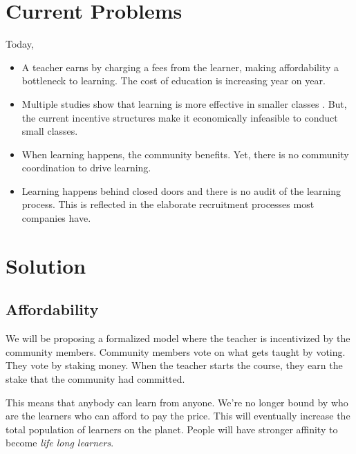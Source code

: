 \documentclass{article}
\begin{document}
  \section{Current Problems} %
    Today,
    \begin{itemize}
      \item A teacher earns by charging a fees from the learner, making affordability a bottleneck to learning. The cost of education is increasing year on year. \cite{feesincrease}
      \item Multiple studies show that learning is more effective in smaller classes \cite{starresearch}. 
        But, the current incentive structures make it economically infeasible to conduct small classes. %
      \item When learning happens, the community benefits. Yet, there is no community coordination to drive learning. %
      \item Learning happens behind closed doors and there is no audit of the learning process. This is reflected in the elaborate recruitment processes most companies have. \cite{roundsofinterviewcount}
    \end{itemize}

  \section{Solution}
    \subsection{Affordability}
      We will be proposing a formalized model where the teacher is incentivized by the community members. Community members vote on what gets taught by voting. They vote by staking money. When the teacher starts the course, they earn the stake that the community had committed.
      \par
      This means that anybody can learn from anyone. We're no longer bound by who are the learners who can afford to pay the price. This will eventually increase the total population of learners on the planet. People will have stronger affinity to become \textit{life long learners}.
\end{document}
